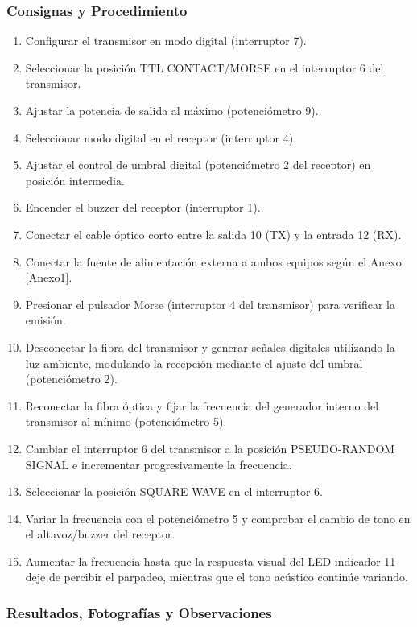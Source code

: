\subsubsection*{Consignas y Procedimiento}
\begin{enumerate}
    \item Configurar el transmisor en modo digital (interruptor 7).
    \item Seleccionar la posición TTL CONTACT/MORSE en el interruptor 6 del transmisor.
    \item Ajustar la potencia de salida al máximo (potenciómetro 9).
    \item Seleccionar modo digital en el receptor (interruptor 4).
    \item Ajustar el control de umbral digital (potenciómetro 2 del receptor) en posición intermedia.
    \item Encender el buzzer del receptor (interruptor 1).
    \item Conectar el cable óptico corto entre la salida 10 (TX) y la entrada 12 (RX).
    \item Conectar la fuente de alimentación externa a ambos equipos según el Anexo \ref{Anexo1}.
    \item Presionar el pulsador Morse (interruptor 4 del transmisor) para verificar la emisión.
    \item Desconectar la fibra del transmisor y generar señales digitales utilizando la luz ambiente, modulando la recepción mediante el ajuste del umbral (potenciómetro 2).
    \item Reconectar la fibra óptica y fijar la frecuencia del generador interno del transmisor al mínimo (potenciómetro 5).
    \item Cambiar el interruptor 6 del transmisor a la posición PSEUDO-RANDOM SIGNAL e incrementar progresivamente la frecuencia.
    \item Seleccionar la posición SQUARE WAVE en el interruptor 6.
    \item Variar la frecuencia con el potenciómetro 5 y comprobar el cambio de tono en el altavoz/buzzer del receptor.
    \item Aumentar la frecuencia hasta que la respuesta visual del LED indicador 11 deje de percibir el parpadeo, mientras que el tono acústico continúe variando.
\end{enumerate}

\subsubsection*{Resultados, Fotografías y Observaciones}

